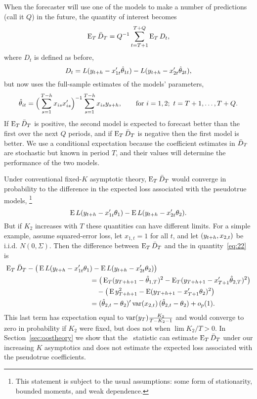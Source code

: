 \documentclass[12pt]{article}
\begin{document}
When the forecaster will use one of the models to make a number of
predictions (call it $Q$) in the future, the quantity of interest
becomes
\begin{equation*}
  \operatorname{E}_T \bar{D}_{T} = Q^{-1} \sum_{t=T+1}^{T+Q} \operatorname{E}_T D_t,
\end{equation*}
where $D_t$ is defined as before,
\begin{equation*}
  D_t = L(y_{t+h} - x_{1t}'\hat\theta_{1t}) - L(y_{t+h} - x_{2t}'\hat\theta_{2t}),
\end{equation*}
but now uses the full-sample estimates of the models' parameters,
\begin{equation*}
  \hat\theta_{it} = \Big(\sum_{s=1}^{T-h} x_{is}x_{is}'\Big)^{-1} \sum_{s=1}^{T-h}
  x_{is} y_{s+h}, \qquad \text{for } i=1,2;\ t = T+1,\dots, T + Q.
\end{equation*}
If $\operatorname{E}_T \bar{D}_{T}$ is positive, the second model is expected to forecast
better than the first over the next $Q$ periods, and if $\operatorname{E}_T \bar{D}_{T}$
is negative then the first model is better. We use a conditional
expectation because the coefficient estimates in $\bar{D}_{T}$ are
stochastic but known in period $T$, and their values will determine
the performance of the two models.

Under conventional fixed-$K$ asymptotic theory, $\operatorname{E}_T \bar{D}_{T}$ would
converge in probability to the difference in the expected loss
associated with the pseudotrue models,%
\footnote{This statement is subject to the usual assumptions: some
  form of stationarity, bounded moments, and weak dependence.} %
\begin{equation}\label{eq:22}
  \operatorname{E} L(y_{t+h} - x_{1t}'\theta_{1}) - \operatorname{E} L(y_{t+h} - x_{2t}'\theta_{2}).
\end{equation}
But if $K_2$ increases with $T$ these quantities can have different
limits. For a simple example, assume squared-error loss, let $x_{1,t}
= 1$ for all $t$, and let $(y_{t+h},x_{2,t})$ be i.i.d. $N(0,
\Sigma)$.  Then the difference between $\operatorname{E}_T \bar{D}_{T}$ and
the in quantity~\eqref{eq:22} is
\begin{align*}
  \operatorname{E}_T \bar{D}_{T} - \big(\operatorname{E} L(y_{t+h} - x_{1t}'\theta_{1}&) - \operatorname{E} L(y_{t+h} - x_{2t}'\theta_{2})\big) \\
  &= \big(\operatorname{E}_T (y_{T+h+1} - \hat\theta_{1,T})^2 -
     \operatorname{E}_T (y_{T+h+1} - x_{T+1}'\hat\theta_{2,T})^2\big) \\
     &\quad - \big(\operatorname{E} y_{T+h+1}^2 - \operatorname{E} (y_{T+h+1} - x_{T+1}'\theta_2)^2 \big)\\
  &= (\hat\theta_{2,t} - \theta_2)' \operatorname{var}(x_{2,t})\, (\hat\theta_{2,t} - \theta_2) + o_p(1).
\end{align*}
This last term has expectation equal to $\operatorname{var}(y_T) \frac{K_2}{T - K_2 - 1}$ and
would converge to zero in probability if $K_2$ were fixed, but does not when $\lim
K_2 / T > 0$. In Section~\ref{sec:oostheory} we show that the \oost\
statistic can estimate $\operatorname{E}_T \bar{D}_{T}$ under our increasing $K$
asymptotics and does not estimate the expected loss associated with
the pseudotrue coefficients.
\end{document}
